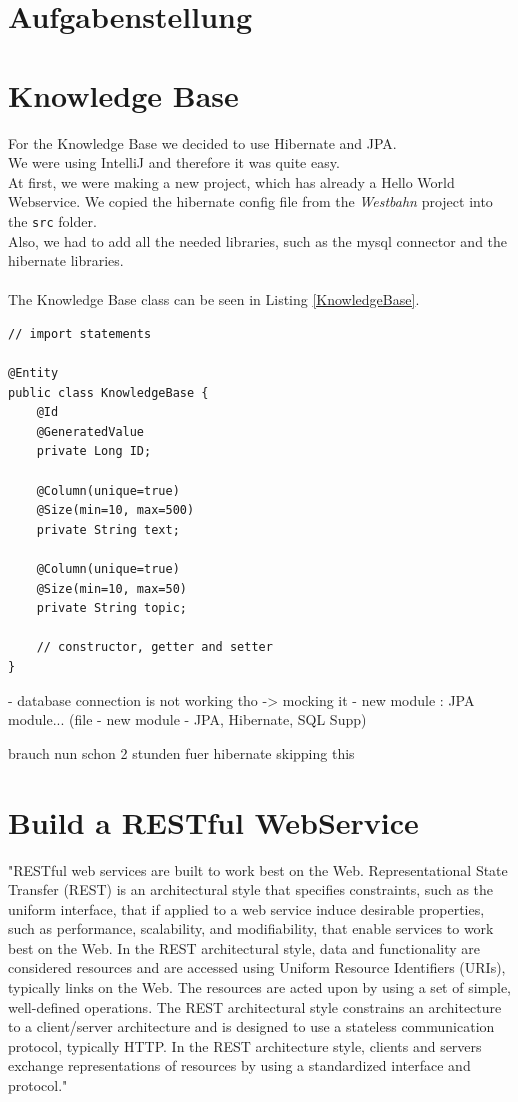 \documentclass[12pt]{article}
\begin{document}
\section{Aufgabenstellung}

\section{Knowledge Base}
For the Knowledge Base we decided to use Hibernate and JPA. \\
We were using IntelliJ and therefore it was quite easy. \\
At first, we were making a new project, which has already a Hello World Webservice. We copied the hibernate config file from the \textit{Westbahn} project into the \texttt{src} folder.\\
Also, we had to add all the needed libraries, such as the mysql connector and the hibernate libraries.\\
\\
The Knowledge Base class can be seen in Listing \ref{KnowledgeBase}.
\begin{lstlisting}[caption=KnowledgeBase entity class, label=KnowledgeBase]
// import statements

@Entity
public class KnowledgeBase {
    @Id
    @GeneratedValue
    private Long ID;

    @Column(unique=true)
    @Size(min=10, max=500)
    private String text;

    @Column(unique=true)
    @Size(min=10, max=50)
    private String topic;

	// constructor, getter and setter
}
\end{lstlisting}

- database connection is not working tho
-> mocking it
- new module : JPA module... (file - new module - JPA, Hibernate, SQL Supp)


brauch nun schon 2 stunden fuer hibernate
skipping this


\section{Build a RESTful WebService}
"RESTful web services are built to work best on the Web. Representational State Transfer (REST) is an architectural style that specifies constraints, such as the uniform interface, that if applied to a web service induce desirable properties, such as performance, scalability, and modifiability, that enable services to work best on the Web. In the REST architectural style, data and functionality are considered resources and are accessed using Uniform Resource Identifiers (URIs), typically links on the Web. The resources are acted upon by using a set of simple, well-defined operations. The REST architectural style constrains an architecture to a client/server architecture and is designed to use a stateless communication protocol, typically HTTP. In the REST architecture style, clients and servers exchange representations of resources by using a standardized interface and protocol."\cite{javaEE6}
\end{document}
